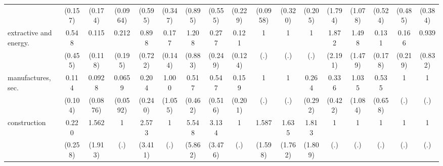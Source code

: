 {\begin{tabular}{l*{16}{c}}
                    &     (0.157)         &     (0.174)         &    (0.0964)         &     (0.595)         &     (0.347)         &     (0.895)         &     (0.555)         &     (0.229)         &    (0.0958)         &     (0.320)         &     (0.205)         &     (1.794)         &     (1.078)         &     (0.524)         &     (0.485)         &     (0.384)         \\
[1em]
extractive and energy.&       0.548         &       0.115\sym{*}  &       0.212         &       0.898         &       0.177\sym{*}  &       1.208         &       0.277         &       0.121\sym{*}  &           1         &           1         &           1         &       1.872         &       1.498         &       0.131         &       0.166         &       0.939         \\
                    &     (0.455)         &     (0.118)         &     (0.195)         &     (0.722)         &     (0.144)         &     (0.883)         &     (0.249)         &     (0.124)         &         (.)         &         (.)         &         (.)         &     (2.191)         &     (1.479)         &     (0.178)         &     (0.219)         &     (0.832)         \\
[1em]
manufactures, sec.  &       0.114\sym{*}  &      0.0928\sym{*}  &      0.0659\sym{**} &       0.204         &       1.000         &       0.517         &       0.547         &       0.159         &           1         &           1         &       0.264         &       0.336         &       1.035         &       0.535         &           1         &           1         \\
                    &     (0.104)         &    (0.0876)         &    (0.0592)         &     (0.240)         &     (1.055)         &     (0.462)         &     (0.516)         &     (0.201)         &         (.)         &         (.)         &     (0.292)         &     (0.422)         &     (1.084)         &     (0.658)         &         (.)         &         (.)         \\
[1em]
construction        &       0.220         &       1.562         &           1         &       2.573         &           1         &       5.548         &       3.134         &           1         &       1.587         &       1.635         &       1.813         &           1         &           1         &           1         &           1         &           1         \\
                    &     (0.258)         &     (1.913)         &         (.)         &     (3.411)         &         (.)         &     (5.862)         &     (3.476)         &         (.)         &     (1.598)         &     (1.762)         &     (1.809)         &         (.)         &         (.)         &         (.)         &         (.)         &         (.)         \\

\end{tabular}}
